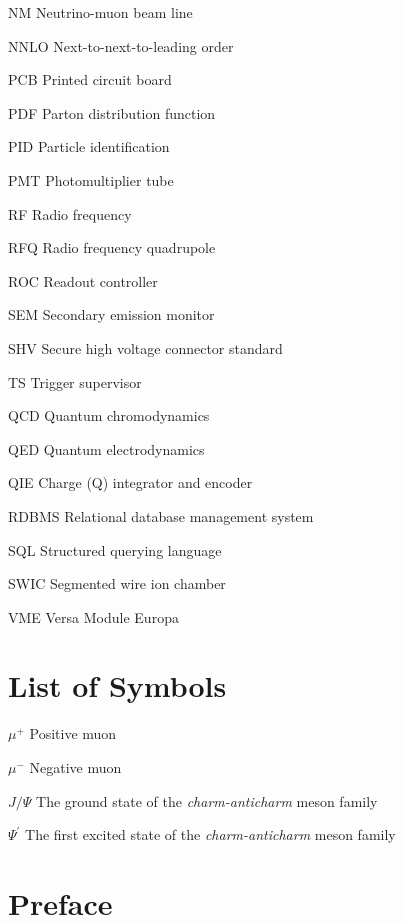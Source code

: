 \documentclass[edeposit,fullpage]{uiucthesis2009}
\begin{document}
\begin{symbollist*}
	\item[NM] Neutrino-muon beam line
	\item[NNLO] Next-to-next-to-leading order
	\item[PCB] Printed circuit board
	\item[PDF] Parton distribution function
	\item[PID] Particle identification
	\item[PMT] Photomultiplier tube
	\item[RF] Radio frequency
	\item[RFQ] Radio frequency quadrupole
	\item[ROC] Readout controller
	\item[SEM] Secondary emission monitor
	\item[SHV] Secure high voltage connector standard
	\item[TS] Trigger supervisor
	\item[QCD] Quantum chromodynamics
	\item[QED] Quantum electrodynamics
	\item[QIE] Charge (Q) integrator and encoder
	\item[RDBMS] Relational database management system
	\item[SQL] Structured querying language
	\item[SWIC] Segmented wire ion chamber
	\item[VME] Versa Module Europa
\end{symbollist*}

\chapter{List of Symbols}

\begin{symbollist}[0.7in]
\item[$\mu^+$] Positive muon
\item[$\mu^-$] Negative muon
\item[$J/\Psi$] The ground state of the \emph{charm-anticharm} meson family
\item[$\Psi^\prime$] The first excited state of the \emph{charm-anticharm} meson family
\end{symbollist}

\mainmatter

\chapter*{Preface}
\end{document}
